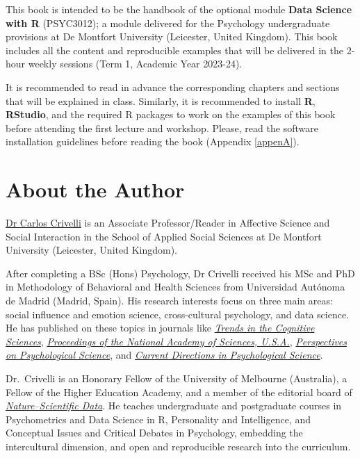 \documentclass[
]{book}
\theoremstyle{definition}
\theoremstyle{definition}
\theoremstyle{definition}
\theoremstyle{definition}
\theoremstyle{remark}
\begin{document}
This book is intended to be the handbook of the optional module \textbf{Data Science with R} (PSYC3012); a module delivered for the Psychology undergraduate provisions at De Montfort University (Leicester, United Kingdom). This book includes all the content and reproducible examples that will be delivered in the 2-hour weekly sessions (Term 1, Academic Year 2023-24).

It is recommended to read in advance the corresponding chapters and sections that will be explained in class. Similarly, it is recommended to install \textbf{R}, \textbf{RStudio}, and the required R packages to work on the examples of this book before attending the first lecture and workshop. Please, read the software installation guidelines before reading the book (Appendix \ref{appenA}).

\hypertarget{about-the-author}{%
\section*{About the Author}\label{about-the-author}}

\href{https://www.dmu.ac.uk/about-dmu/academic-staff/health-and-life-sciences/carlos-crivelli/carlos-crivelli.aspx}{Dr Carlos Crivelli} is an Associate Professor/Reader in Affective Science and Social Interaction in the School of Applied Social Sciences at De Montfort University (Leicester, United Kingdom).

After completing a BSc (Hons) Psychology, Dr Crivelli received his MSc and PhD in Methodology of Behavioral and Health Sciences from Universidad Autónoma de Madrid (Madrid, Spain). His research interests focus on three main areas: social influence and emotion science, cross-cultural psychology, and data science. He has published on these topics in journals like \href{https://www.cell.com/trends/cognitive-sciences/fulltext/S1364-6613(18)30029-9}{\emph{Trends in the Cognitive Sciences}}, \href{https://www.pnas.org/doi/full/10.1073/pnas.1611622113}{\emph{Proceedings of the National Academy of Sciences, U.S.A.}}, \href{https://journals.sagepub.com/doi/10.1177/17456916221148142}{\emph{Perspectives on Psychological Science}}, and \href{https://journals.sagepub.com/doi/full/10.1177/0963721417746794}{\emph{Current Directions in Psychological Science}}.

Dr.~Crivelli is an Honorary Fellow of the University of Melbourne (Australia), a Fellow of the Higher Education Academy, and a member of the editorial board of \href{https://www.nature.com/sdata/}{\emph{Nature--Scientific Data}}. He teaches undergraduate and postgraduate courses in Psychometrics and Data Science in R, Personality and Intelligence, and Conceptual Issues and Critical Debates in Psychology, embedding the intercultural dimension, and open and reproducible research into the curriculum.
\end{document}
